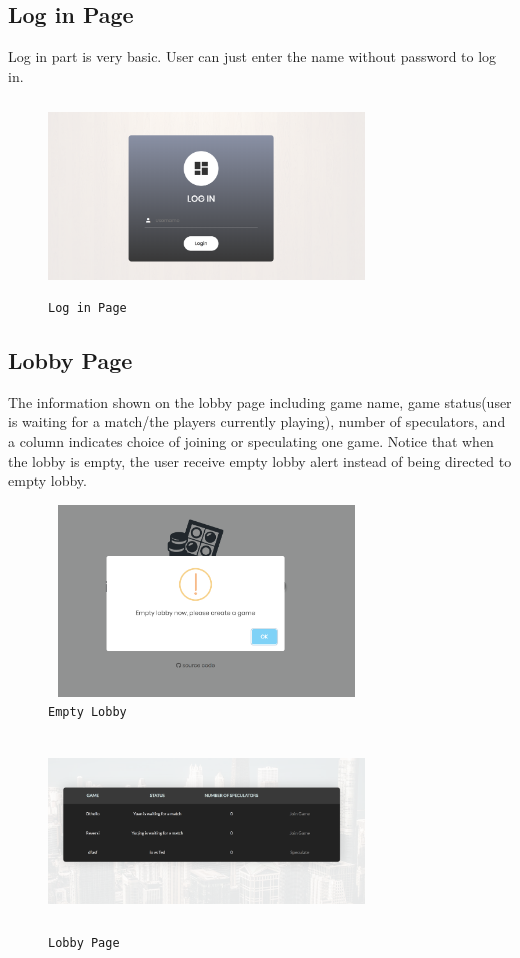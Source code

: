 \subsection{Log in Page}
Log in part is very basic. User can just enter the name without password to 
log in.
\begin{figure}[!htb]
\includegraphics[height=2.0in, width=3.3in]{login.png}
\caption{\texttt{Log in Page}}
\end{figure}

\subsection{Lobby Page}
The information shown on the lobby page including game name, game status(user
is waiting for a match/the players currently playing), number of speculators,
and a column indicates choice of joining or speculating one game. Notice that 
when the lobby is empty, the user receive empty lobby alert instead of being
directed to empty lobby.
\begin{figure}[!htb]
\includegraphics[height=2.0in, width=3.3in]{lobby.png}
\caption{\texttt{Empty Lobby}}
\end{figure}
\begin{figure}[!htb]
\includegraphics[height=2.0in, width=3.3in]{lobby2.png}
\caption{\texttt{Lobby Page}}
\end{figure}

